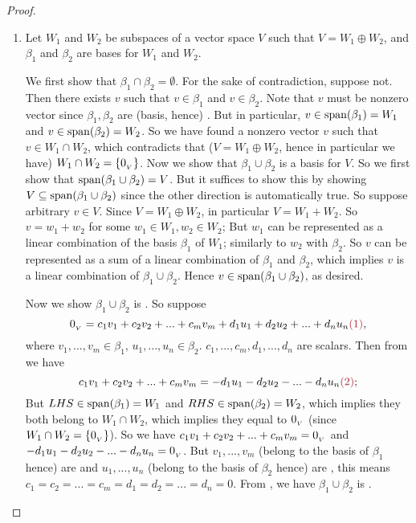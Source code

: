 \begin{proof} \ 
\begin{enumerate}
\item
Let \(W_1\) and \(W_2\) be subspaces of a vector space \(V\) such that \(V = W_1 \oplus W_2\), and \(\beta_1\) and \(\beta_2\) are bases for \(W_1\) and \(W_2\).

We first show that \(\beta_1 \cap \beta_2 = \emptyset\).
For the sake of contradiction, suppose not.
Then there exists \(v\) such that \(v \in \beta_1\) and \(v \in \beta_2\).
Note that \(v\) must be nonzero vector since \(\beta_1, \beta_2\) are (basis, hence) \LID{}.
But in particular, \(v \in \operatorname{span}(\beta_1) = W_1\) and \(v \in \operatorname{span}(\beta_2) = W_2\).
So we have found a nonzero vector \(v\) such that \(v \in W_1 \cap W_2\), which contradicts that (\(V = W_1 \oplus W_2\), hence in particular we have) \(W_1 \cap W_2 = \{ 0_{_V} \}\).
Now we show that \(\beta_1 \cup \beta_2\) is a basis for \(V\).
So we first show that \(\operatorname{span}(\beta_1 \cup \beta_2) = V\).
But it suffices to show this by showing \(V \subseteq \operatorname{span}(\beta_1 \cup \beta_2)\) since the other direction is automatically true.
So suppose arbitrary \(v \in V\).
Since \(V = W_1 \oplus W_2\), in particular \(V = W_1 + W_2\).
So \(v = w_1 + w_2\) for some \(w_1 \in W_1, w_2 \in W_2\);
But \(w_1\) can be represented as a linear combination of the basis \(\beta_1\) of \(W_1\); similarly to \(w_2\) with \(\beta_2\).
So \(v\) can be represented as a sum of a linear combination of \(\beta_1\) and \(\beta_2\), which implies \(v\) is a linear combination of \(\beta_1 \cup \beta_2\).
Hence \(v \in \operatorname{span}(\beta_1 \cup \beta_2)\), as desired.

Now we show \(\beta_1 \cup \beta_2\) is \LID{}.
So suppose
\[
    \OV = c_1 v_1 + c_2 v_2 + ... + c_m v_m + d_1 u_1 + d_2 u_2 + ... + d_n u_n ,
\]
where \(v_1, ..., v_m \in \beta_1\), \(u_1, ..., u_n \in \beta_2\). \(c_1, ..., c_m, d_1, ..., d_n\) are scalars.
Then from \MAROON{(1)} we have
\[
    c_1 v_1 + c_2 v_2 + ... + c_m v_m = - d_1 u_1 - d_2 u_2 - ... - d_n u_n \MAROON{(2)};
\]
But \(LHS \in \operatorname{span}(\beta_1) = W_1\) and \(RHS \in \operatorname{span}(\beta_2) = W_2\), which implies they both belong to \(W_1 \cap W_2\), which implies they equal to \(0_{_V}\) (since \(W_1 \cap W_2 = \{ 0_{_V} \}\)).
So we have \(c_1 v_1 + c_2 v_2 + ... + c_m v_m = 0_{_V}\) and \(- d_1 u_1 - d_2 u_2 - ... - d_n u_n = 0_{_V}\).
But \(v_1, ..., v_m\) (belong to the basis of \(\beta_1\) hence) are \LID{} and \(u_1, ..., u_n\) (belong to the basis of \(\beta_2\) hence) are \LID{}, this means \(c_1 = c_2 = ... = c_m = d_1 = d_2 = ... = d_n = 0\).
From \MAROON{(1)}, we have \(\beta_1 \cup \beta_2\) is \LID{}.


\end{enumerate}
\end{proof}
